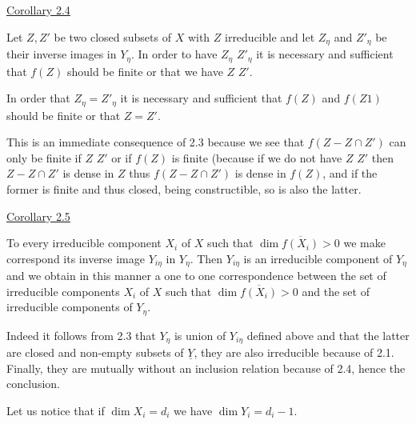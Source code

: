 
\uline{Corollary 2.4}

Let $Z,Z'$ be two closed subsets of $X$ with $Z$ irreducible and let
$Z_\eta$ and $Z'_\eta$ be their inverse images in $Y_\eta$. In order to have
$Z_\eta$ \hand{$\subset$} $Z'_\eta$ it is necessary and sufficient that $f(Z)$ should be
finite or that we have $Z$ \hand{$\subset$} $Z'$.

In order that $Z_\eta = Z'_\eta$ it is necessary and sufficient that
$f(Z)$ and $f(Z1)$ should be finite or that $Z = Z'$.

This is an immediate consequence of 2.3 because we see that
$f(Z - Z\cap Z')$ can only be finite if $Z$ \hand{$\subset$} $Z'$ or if $f(Z)$ is finite
(because if we do not have $Z$ \hand{$\subset$} $Z'$ then $Z - Z\cap Z'$ is dense in $Z$
thus $f(Z - Z\cap Z')$ is dense in $f(Z)$, and if the former is finite and
thus closed, being constructible, so is also the latter.

\uline{Corollary 2.5}

To every irreducible component $X_i$ of $X$ such that $\dim \overline{f(X_i)} > 0$
we make correspond its inverse image $Y_{i\eta}$ in $Y_\eta$. Then $Y_{i\eta}$ is an
irreducible component of $Y_\eta$ and we obtain in this manner a one to
one correspondence between the set of irreducible components $X_i$ of
$X$ such that $\dim \overline{f(X_i)} > 0$ and the set of irreducible components of
$Y_\eta$.

Indeed it follows from 2.3 that $Y_\eta$ is union of $Y_{i\eta}$ defined
above and that the latter are closed and non-empty subsets of $\underline{Y}$,
they are also irreducible because of 2.1. Finally, they are
mutually without an inclusion relation because of 2.4, hence the
conclusion.

Let us notice that if $\dim X_i = d_i$ we have $\dim Y_i = d_i - 1$.
